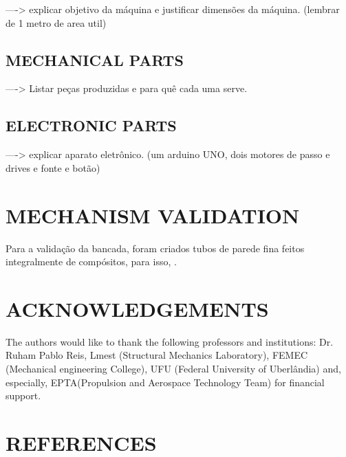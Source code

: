 \documentclass[10pt,fleqn,a4paper,twoside]{article}
\begin{document}
----> explicar objetivo da máquina e justificar dimensões da máquina. (lembrar de 1 metro de area util)

\subsection{MECHANICAL PARTS}
----> Listar peças produzidas e para quê cada uma serve.

\subsection{ELECTRONIC PARTS}

----> explicar aparato eletrônico. (um arduino UNO, dois motores de passo e drives e fonte e botão)

\section{MECHANISM VALIDATION}
Para a validação da bancada, foram criados tubos de parede fina feitos integralmente de compósitos, para isso, .







\section{ACKNOWLEDGEMENTS}
The authors would like to thank the following professors and institutions: Dr. Ruham Pablo Reis, Lmest (Structural Mechanics Laboratory), FEMEC (Mechanical engineering College), UFU (Federal University of Uberl\^andia) and, especially, EPTA(Propulsion and Aerospace Technology Team) for financial support.

\section{REFERENCES} 


\renewcommand{\refname}{}

\end{document}

